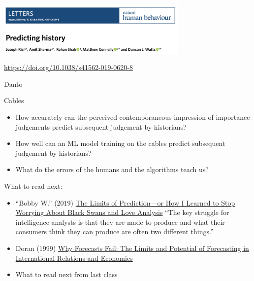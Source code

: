 \documentclass{beamer}
\begin{document}
\begin{frame}

\begin{center}
\includegraphics[width=0.7\textwidth]{figures/risi_predicting_2019_title}
\end{center}

\vfill
\url{https://doi.org/10.1038/s41562-019-0620-8}

\end{frame}
\begin{frame}

Danto

\end{frame}
\begin{frame}

Cables

\end{frame}
\begin{frame}

\begin{itemize}
\item How accurately can the perceived contemporaneous impression of importance judgements predict subsequent judgement by historians?
\item How well can an ML model training on the cables predict subsequent judgement by historians?
\item What do the errors of the humans and the algorithms teach us?
\end{itemize}

\end{frame}
\begin{frame}

What to read next:
\begin{itemize}
\item ``Bobby W.'' (2019) \href{https://www.cia.gov/library/center-for-the-study-of-intelligence/csi-publications/csi-studies/studies/vol-63-no-4/Limits-of-Prediction.html}{The Limits of Prediction---or How I Learned to Stop Worrying About Black Swans and Love Analysis} ``The key struggle for intelligence analysts is that they are made to produce and what their consumers think they can produce are often two different things.''
\item Doran (1999) \href{https://www.jstor.org/stable/3186379}{Why Forecasts Fail: The Limits and Potential of Forecasting in International Relations and Economics}
\item What to read next from last class
\end{itemize}

\end{frame}
\end{document}
